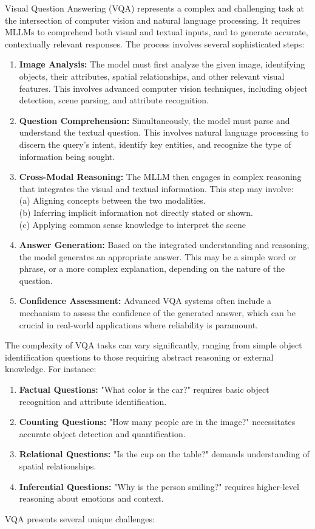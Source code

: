 Visual Question Answering (VQA) represents a complex and challenging task at the intersection of computer vision and natural language processing. It requires MLLMs to comprehend both visual and textual inputs, and to generate accurate, contextually relevant responses. The process involves several sophisticated steps:
\begin{enumerate}
    \item \textbf{Image Analysis:} The model must first analyze the given image, identifying objects, their attributes, spatial relationships, and other relevant visual features. This involves advanced computer vision techniques, including object detection, scene parsing, and attribute recognition.
    \item \textbf{Question Comprehension:} Simultaneously, the model must parse and understand the textual question. This involves natural language processing to discern the query's intent, identify key entities, and recognize the type of information being sought.
    \item \textbf{Cross-Modal Reasoning:} The MLLM then engages in complex reasoning that integrates the visual and textual information. This step may involve:
    \\
     (a) Aligning concepts between the two modalities.\\
   (b) Inferring implicit information not directly stated or shown.\\
   (c) Applying common sense knowledge to interpret the scene
    \item \textbf{Answer Generation:} Based on the integrated understanding and reasoning, the model generates an appropriate answer. This may be a simple word or phrase, or a more complex explanation, depending on the nature of the question.
    \item \textbf{Confidence Assessment:} Advanced VQA systems often include a mechanism to assess the confidence of the generated answer, which can be crucial in real-world applications where reliability is paramount.
\end{enumerate}

The complexity of VQA tasks can vary significantly, ranging from simple object identification questions to those requiring abstract reasoning or external knowledge. For instance:

\begin{enumerate}
    \item \textbf{Factual Questions:} "What color is the car?" requires basic object recognition and attribute identification.
    \item \textbf{Counting Questions:} "How many people are in the image?" necessitates accurate object detection and quantification.
    \item \textbf{Relational Questions:} "Is the cup on the table?" demands understanding of spatial relationships.
    \item \textbf{Inferential Questions:} "Why is the person smiling?" requires higher-level reasoning about emotions and context.
\end{enumerate}
VQA presents several unique challenges:

